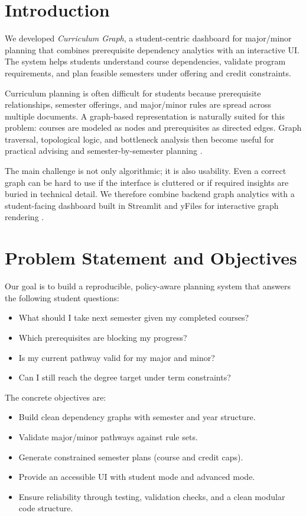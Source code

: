 \section{Introduction}
We developed \textit{Curriculum Graph}, a student-centric dashboard for
major/minor planning that combines prerequisite dependency analytics with an
interactive UI. The system helps students understand course dependencies,
validate program requirements, and plan feasible semesters under offering and
credit constraints.

Curriculum planning is often difficult for students because prerequisite
relationships, semester offerings, and major/minor rules are spread across
multiple documents. A graph-based representation is naturally suited for this
problem: courses are modeled as nodes and prerequisites as directed edges.
Graph traversal, topological logic, and bottleneck analysis then become useful
for practical advising and semester-by-semester planning \citep{networkx_2008}.

The main challenge is not only algorithmic; it is also usability. Even a
correct graph can be hard to use if the interface is cluttered or if required
insights are buried in technical detail. We therefore combine backend graph
analytics with a student-facing dashboard built in Streamlit \citep{streamlit}
and yFiles for interactive graph rendering \citep{yfiles_streamlit}.


\section{Problem Statement and Objectives}
Our goal is to build a reproducible, policy-aware planning system that answers
the following student questions:

\begin{itemize}
    \item What should I take next semester given my completed courses?
    \item Which prerequisites are blocking my progress?
    \item Is my current pathway valid for my major and minor?
    \item Can I still reach the degree target under term constraints?
\end{itemize}

The concrete objectives are:

\begin{itemize}
    \item Build clean dependency graphs with semester and year structure.
    \item Validate major/minor pathways against rule sets.
    \item Generate constrained semester plans (course and credit caps).
    \item Provide an accessible UI with student mode and advanced mode.
    \item Ensure reliability through testing, validation checks, and a clean
    modular code structure.
\end{itemize}

